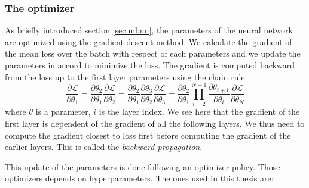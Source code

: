 \documentclass[../main.tex]{subfiles}
\begin{document}
\subsubsection{The optimizer}

As briefly introduced section \ref{sec:ml:nn}, the parameters of the neural network are optimized using the gradient descent method. We calculate the gradient of the mean loss over the batch with respect of each parameters and we update the parameters in accord to minimize the loss. The  gradient is computed backward from the loss up to the first layer parameters using the chain rule:
\begin{equation}
  \label{eq:ml:backward}
  \frac{\partial \mathcal{L}}{\partial \theta_1} = \frac{\partial \theta_2}{\partial \theta_1} \frac{\partial \mathcal{L}}{\partial \theta_2} = \frac{\partial \theta_2}{\partial \theta_1} \frac{\partial \theta_3}{\partial \theta_2} \frac{\partial \mathcal{L}}{\partial \theta_3} = \frac{\partial \theta_2}{\partial \theta_1} \prod_{i=2}^{N-1} \frac{\partial \theta_{i+1}}{\partial \theta_i} \frac{\partial \mathcal{L}}{\partial \theta_N}
\end{equation}
where $\theta$ is a parameter, $i$ is the layer index. We see here that the gradient of the first layer is dependent of the gradient of all the following layers. We thus need to compute the gradient closest to loss first before computing the gradient of the earlier layers. This is called the \textit{backward propagation}.

This update of the parameters is done following an optimizer policy. Those optimizers depends on hyperparameters. The ones used in this thesis are:
\end{document}
